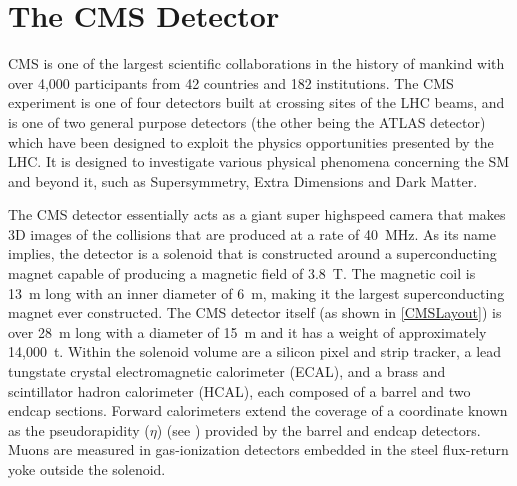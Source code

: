 \chapter{The CMS Detector\label{ch:CMS}}

CMS is one of the largest scientific collaborations in the history of mankind with over 4,000 participants from 42 countries and 182 institutions.
The CMS experiment is one of four detectors built at crossing sites of the LHC beams, and is one of two general purpose detectors (the other being the ATLAS detector) which have been designed to exploit the physics opportunities presented by the LHC.
It is designed to investigate various physical phenomena concerning the SM and beyond it, such as Supersymmetry, Extra Dimensions and Dark Matter.

The CMS detector essentially acts as a giant super highspeed camera that makes 3D images of the collisions that are produced at a rate of 40~\unit{MHz}.
As its name implies, the detector is a solenoid that is constructed around a superconducting magnet capable of producing a magnetic field of 3.8~\unit{\tesla}.
The magnetic coil is 13~\unit{m} long with an inner diameter of 6~\unit{m}, making it the largest superconducting magnet ever constructed.
The CMS detector itself  (as shown in \autoref{CMSLayout}) is over 28~\unit{m} long with a diameter of 15~\unit{m} and it has a weight of approximately 14,000~\unit{\tonne}.
Within the solenoid volume are a silicon pixel and strip tracker, a lead tungstate crystal electromagnetic calorimeter (ECAL), and a brass and scintillator hadron calorimeter (HCAL), each composed of a barrel and two endcap sections. Forward calorimeters extend the coverage of a coordinate known as the pseudorapidity ($\eta$) (see ) provided by the barrel and endcap detectors. Muons are measured in gas-ionization detectors embedded in the steel flux-return yoke outside the solenoid.

